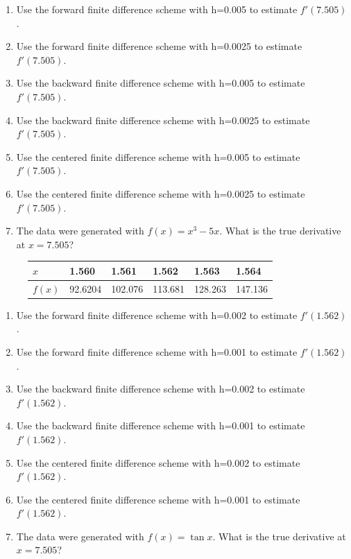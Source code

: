 {\begin{enumerate}[label=\alph*)]
	\item Use the forward finite difference scheme with h=0.005 to estimate $f'(7.505)$.
	
	\item Use the forward finite difference scheme with h=0.0025 to estimate $f'(7.505)$.

	\item Use the backward finite difference scheme with h=0.005 to estimate $f'(7.505)$.

	\item Use the backward finite difference scheme with h=0.0025 to estimate $f'(7.505)$.
	
	\item Use the centered finite difference scheme with h=0.005 to estimate $f'(7.505)$.

	\item Use the centered finite difference scheme with h=0.0025 to estimate $f'(7.505)$.

	\item The data were generated with $f(x)=x^3 - 5x$. What is the true derivative at $x=7.505$?
\end{enumerate}


\begin{figure}[h]
\begin{tabular}{l|lllll}
$x$    & 1.560   & 1.561   & 1.562   & 1.563   & 1.564 \\  \hline
$f(x)$ & 92.6204 & 102.076 & 113.681 & 128.263 & 147.136
\end{tabular}
\end{figure}

\begin{enumerate}[label=\alph*)]
	\item Use the forward finite difference scheme with h=0.002 to estimate $f'(1.562)$.
	
	\item Use the forward finite difference scheme with h=0.001 to estimate $f'(1.562)$.

	\item Use the backward finite difference scheme with h=0.002 to estimate $f'(1.562)$.

	\item Use the backward finite difference scheme with h=0.001 to estimate $f'(1.562)$.
	
	\item Use the centered finite difference scheme with h=0.002 to estimate $f'(1.562)$.

	\item Use the centered finite difference scheme with h=0.001 to estimate $f'(1.562)$.

	\item The data were generated with $f(x)=\tan x$. What is the true derivative at $x=7.505$?
\end{enumerate}

}

